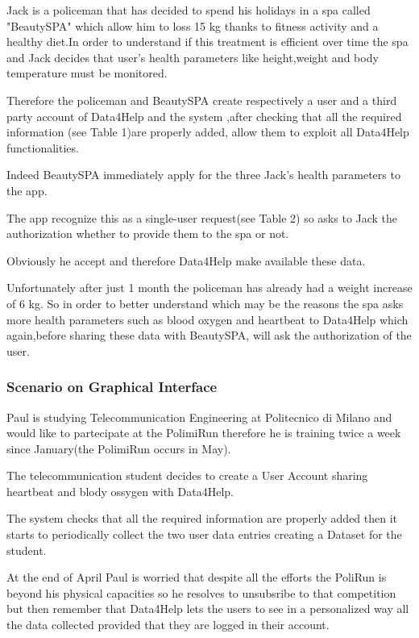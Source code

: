     Jack is a policeman that has decided to spend his holidays in a spa called "BeautySPA" which allow him to loss 15 kg thanks to fitness activity and a healthy diet.In order to understand if this treatment is efficient over time the spa and Jack decides that user's health parameters like height,weight and body temperature must be monitored. 

Therefore the policeman and BeautySPA create respectively a user and a third party account of Data4Help and the system ,after checking that all the required information (see Table 1)are properly added, allow them to exploit all Data4Help functionalities.

 Indeed  BeautySPA immediately apply for the three Jack's health parameters to the app. 

The app recognize this as a single-user request(see Table 2)  so asks to Jack the authorization whether to provide them to the spa or not. 

Obviously he accept and therefore Data4Help make available these data. 

Unfortunately after just 1 month the policeman has already had a weight increase of 6 kg. So in order to better understand which may be the reasons the spa asks more health parameters such as blood oxygen and heartbeat to Data4Help which again,before sharing these data with BeautySPA, will ask the authorization of the user.

     \subsubsection{Scenario on Graphical Interface}
     Paul is studying Telecommunication Engineering at Politecnico di Milano and would like to partecipate at the PolimiRun therefore he is training twice a week since January(the PolimiRun occurs in May).

 The telecommunication student decides to create a User Account sharing heartbeat and blody ossygen with Data4Help. 

The system checks that all the required information are properly added then it starts to periodically collect the two user data entries creating a Dataset for the student. 

At the end of April Paul is worried that despite all the efforts the PoliRun is beyond his physical capacities so he resolves to unsubsribe to that competition but then remember that Data4Help lets the users to see in a personalized way all the data collected provided that they are logged in their account. 

